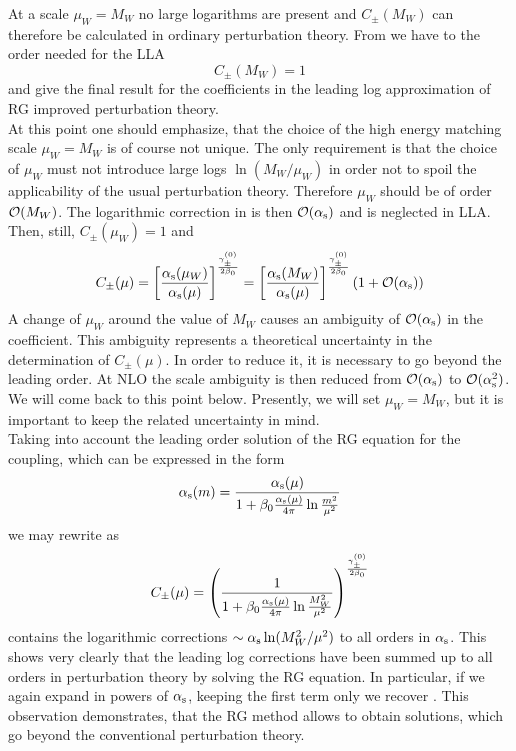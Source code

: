 At a scale $\mu_W=M_W$ no large logarithms are present and $C_\pm(M_W)$
can therefore be calculated in ordinary perturbation theory.
From  we have to the order needed for the LLA
\begin{equation}\label{cmw1}  C_\pm(M_W)=1  \end{equation}
 and  give the final result for the coefficients
in the leading log approximation of RG improved perturbation theory.
\\
At this point one should emphasize, that the choice of the high energy
matching scale $\mu_W=M_W$ is of course not unique. The only
requirement is that the choice of $\mu_W$ must not introduce large
logs $\ln(M_W/\mu_W)$ in order not to spoil the applicability of
the usual perturbation theory. Therefore $\mu_W$ should be of
order ${\cal O}(M_W)$. The logarithmic correction in  is then
${\cal O}(\alpha_{\rm s})$ and is neglected in LLA. Then, still,
$C_\pm(\mu_W)=1$ and
\begin{equation}\label{cpmr2}
C_\pm(\mu)=\left[{\alpha_{\rm s}(\mu_W)\over\alpha_{\rm s}(\mu)}\right]^{\gamma^{(0)}_\pm\over
  2\beta_0} =
\left[{\alpha_{\rm s}(M_W)\over \alpha_{\rm s}(\mu)}\right]^{\gamma^{(0)}_\pm\over
  2\beta_0} (1+{\cal O}(\alpha_{\rm s})) \end{equation}
A change of $\mu_W$ around the value of $M_W$ causes an ambiguity
of ${\cal O}(\alpha_{\rm s})$ in the coefficient. This ambiguity represents a
theoretical uncertainty in the determination of $C_\pm(\mu)$. In
order to reduce it, it is necessary to go beyond the leading order.
At NLO the scale ambiguity is then reduced from ${\cal O}(\alpha_{\rm s})$ to
${\cal O}(\alpha_{\rm s}^2)$. We will come back to this point below. Presently, we
will set $\mu_W=M_W$, but it is important to keep the related
uncertainty in mind.\\
Taking into account the leading order solution of the RG equation
 for the coupling, which can be expressed in the form
\begin{equation}\label{alls}
\alpha_{\rm s}(m)={\alpha_{\rm s}(\mu)\over 1+\beta_0{\alpha_{\rm s}(\mu)\over 4\pi}\ln{m^2\over\mu^2}}  \end{equation}
we may rewrite  as
\begin{equation}\label{clls} C_\pm(\mu)=
\left({1\over 1+\beta_0{\alpha_{\rm s}(\mu)\over 4\pi}\ln{M^2_W\over\mu^2}}\right)^{
   \gamma^{(0)}_\pm\over 2\beta_0}  \end{equation}
 contains the logarithmic corrections
$\sim \alpha_{\rm s}\ln(M^2_W/\mu^2)$ to all orders in $\alpha_{\rm s}$. This shows very
clearly that the leading log corrections have been summed up to
all orders in perturbation theory by solving the RG equation. In
particular, if we again expand  in powers of $\alpha_{\rm s}$, keeping
the first term only we recover .
This observation demonstrates, that the RG method allows to obtain
solutions, which go beyond the conventional perturbation theory.

